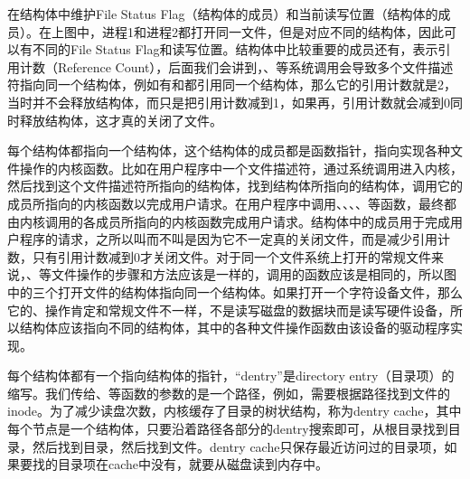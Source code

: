 在结构体中维护File Status Flag（结构体的成员）和当前读写位置（结构体的成员）。在上图中，进程1和进程2都打开同一文件，但是对应不同的结构体，因此可以有不同的File Status Flag和读写位置。结构体中比较重要的成员还有，表示引用计数（Reference Count），后面我们会讲到，、等系统调用会导致多个文件描述符指向同一个结构体，例如有和都引用同一个结构体，那么它的引用计数就是2，当时并不会释放结构体，而只是把引用计数减到1，如果再，引用计数就会减到0同时释放结构体，这才真的关闭了文件。



每个结构体都指向一个结构体，这个结构体的成员都是函数指针，指向实现各种文件操作的内核函数。比如在用户程序中一个文件描述符，通过系统调用进入内核，然后找到这个文件描述符所指向的结构体，找到结构体所指向的结构体，调用它的成员所指向的内核函数以完成用户请求。在用户程序中调用、、、、等函数，最终都由内核调用的各成员所指向的内核函数完成用户请求。结构体中的成员用于完成用户程序的请求，之所以叫而不叫是因为它不一定真的关闭文件，而是减少引用计数，只有引用计数减到0才关闭文件。对于同一个文件系统上打开的常规文件来说，、等文件操作的步骤和方法应该是一样的，调用的函数应该是相同的，所以图中的三个打开文件的结构体指向同一个结构体。如果打开一个字符设备文件，那么它的、操作肯定和常规文件不一样，不是读写磁盘的数据块而是读写硬件设备，所以结构体应该指向不同的结构体，其中的各种文件操作函数由该设备的驱动程序实现。



每个结构体都有一个指向结构体的指针，“dentry”是directory entry（目录项）的缩写。我们传给、等函数的参数的是一个路径，例如，需要根据路径找到文件的inode。为了减少读盘次数，内核缓存了目录的树状结构，称为dentry cache，其中每个节点是一个结构体，只要沿着路径各部分的dentry搜索即可，从根目录\BookCode{/\BookSplit{}}找到目录，然后找到目录，然后找到文件。dentry cache只保存最近访问过的目录项，如果要找的目录项在cache中没有，就要从磁盘读到内存中。



